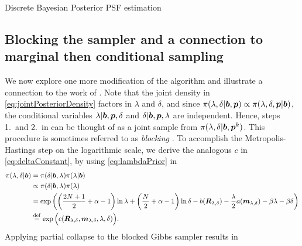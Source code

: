 \begin{chapter}{Discrete Bayesian Posterior PSF estimation}
\subsection{Blocking the sampler and a connection to marginal then conditional sampling}

We now explore one more modification of the algorithm and illustrate a connection to the work of \citep{fox2015fast}.
Note that the joint density in \eqref{eq:jointPosteriorDensity} factors in $\lambda$ and $\delta$, and since $\pi(\lambda,\delta|\mbox{\boldmath$b$},\mbox{\boldmath$p$}) \propto \pi(\lambda,\delta,\mbox{\boldmath$p$}|\mbox{\boldmath$b$})$, the conditional variables $\lambda|\mbox{\boldmath$b$}, \mbox{\boldmath$p$},\delta$ and $\delta|\mbox{\boldmath$b$},\mbox{\boldmath$p$},\lambda$ are independent.
Hence, steps 1.~and 2.~in  can be thought of as a joint sample from $\pi(\lambda,\delta|\mbox{\boldmath$b$},\mbox{\boldmath$p$}^k)$.
This procedure is sometimes referred to as \emph{blocking} \citep{liu2008monte}.
To accomplish the Metropolis-Hastings step on the logarithmic scale, we derive the analogous $c$ in \eqref{eq:deltaConstant}, by using \eqref{eq:lambdaPrior} in
\begin{align}
  \pi(\lambda,\delta|\mbox{\boldmath$b$}) 
    &=\pi(\delta|\mbox{\boldmath$b$},\lambda)\pi(\lambda|\mbox{\boldmath$b$}) \nonumber\\
    &\propto \pi(\delta|\mbox{\boldmath$b$},\lambda)\pi(\lambda) \nonumber\\
    &= \exp\left( \left(\frac {2N+1}2 +\alpha - 1\right)\ln\lambda + \left(\frac N2 +\alpha - 1\right)\ln\delta - b(\mbox{\boldmath$R$}_{\lambda,\delta}) -\frac \lambda 2 a(\mbox{\boldmath$m$}_{\lambda,\delta}) -\beta\lambda -\beta\delta  \right)\nonumber \\
    &\stackrel{\rm def}{=} \exp\Big(c(\mbox{\boldmath$R$}_{\lambda,\delta},\mbox{\boldmath$m$}_{\lambda,\delta},\lambda,\delta)\Big). \label{eq:jointConstant}
\end{align}
Applying partial collapse to the blocked Gibbs sampler results in 


\end{chapter}
